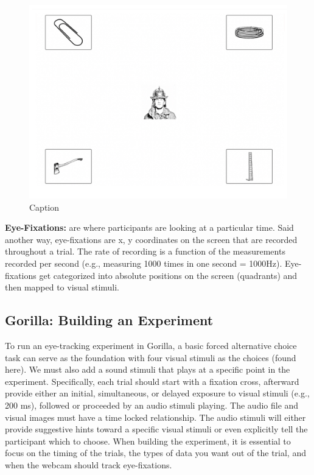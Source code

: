 \begin{figure}[h]
    \centering
    \includegraphics[scale=.075]{figures/porretta_e_al_vi.png}
    \caption{Caption}
    \label{fig:porretta_visual_stimuli}
\end{figure}

\textbf{Eye-Fixations:} are where participants are looking at a particular time. Said another way, eye-fixations are x, y coordinates on the screen that are recorded throughout a trial. The rate of recording is a function of the measurements recorded per second (e.g., measuring 1000 times in one second = 1000Hz). Eye-fixations get categorized into absolute positions on the screen (quadrants) and then mapped to visual stimuli.

\subsection{Gorilla: Building an Experiment}

To run an eye-tracking experiment in Gorilla, a basic forced alternative choice task can serve as the foundation with four visual stimuli as the choices (found here). We must also add a sound stimuli that plays at a specific point in the experiment. Specifically, each trial should start with a fixation cross, afterward provide either an initial, simultaneous, or delayed exposure to visual stimuli (e.g., 200 ms), followed or proceeded by an audio stimuli playing. The audio file and visual images must have a time locked relationship. The audio stimuli will either provide suggestive hints toward a specific visual stimuli or even explicitly tell the participant which to choose. When building the experiment, it is essential to focus on the timing of the trials, the types of data you want out of the trial, and when the webcam should track eye-fixations. 

